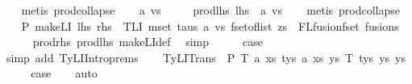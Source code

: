 \begin{isabellebody}
\ \ \isamarkupfalse%
\ {\isacharparenleft}{\kern0pt}metis\ prod{\isachardot}{\kern0pt}collapse{\isacharparenright}{\kern0pt}\isanewline
\ \ \isamarkupfalse%
\ a\ vs\ \isanewline
\ \ \ \ prod{\isacharunderscore}{\kern0pt}lhs{\isacharcolon}{\kern0pt}\ {\isachardoublequoteopen}lhs\ {\isacharequal}{\kern0pt}\ {\isacharparenleft}{\kern0pt}a{\isacharcomma}{\kern0pt}\ vs{\isacharparenright}{\kern0pt}{\isachardoublequoteclose}\isanewline
\ \ \isamarkupfalse%
\ {\isacharparenleft}{\kern0pt}metis\ prod{\isachardot}{\kern0pt}collapse{\isacharparenright}{\kern0pt}\isanewline
\ \ \isamarkupfalse%
\ P{}{\isacharcolon}{\kern0pt}\ {\isachardoublequoteopen}make{\isacharunderscore}{\kern0pt}LI\ {\isacharparenleft}{\kern0pt}lhs{\isacharcomma}{\kern0pt}\ rhs{\isacharparenright}{\kern0pt}\ {\isacharequal}{\kern0pt}\ TLI\ {\isacharparenleft}{\kern0pt}mset\ taus{\isacharparenright}{\kern0pt}\ a\ vs\ {\isacharparenleft}{\kern0pt}fset{\isacharunderscore}{\kern0pt}of{\isacharunderscore}{\kern0pt}list\ zs\ {\isacharbar}{\kern0pt}{\isasymunion}{\isacharbar}{\kern0pt}\ FLfusion{\isacharunderscore}{\kern0pt}fset\ fusions{\isacharparenright}{\kern0pt}{\isachardoublequoteclose}\isanewline
\ \ \ \ \isamarkupfalse%
\ prod{\isacharunderscore}{\kern0pt}rhs\ prod{\isacharunderscore}{\kern0pt}lhs\ make{\isacharunderscore}{\kern0pt}LI{\isacharunderscore}{\kern0pt}def\ \isamarkupfalse%
\ simp\isanewline
\ \ \isamarkupfalse%
\ \isamarkupfalse%
\ {\isacharquery}{\kern0pt}case\isanewline
\ \ \ \ \isamarkupfalse%
\ {\isacharparenleft}{\kern0pt}simp\ add{\isacharcolon}{\kern0pt}\ TyLIIntro{\isachardot}{\kern0pt}prems{\isacharparenleft}{\kern0pt}{}{\isacharparenright}{\kern0pt}{\isacharparenright}{\kern0pt}\isanewline
{}\isamarkupfalse%
\isanewline
\ \ \isamarkupfalse%
\ {\isacharparenleft}{\kern0pt}TyLITrans\ {\isasymGamma}\ P\ T{}\ a{}\ xs{}\ tys{}\ a{}\ xs{}\ ys{}\ T{}\ tys{}\ ys{}\ ys{\isacharparenright}{\kern0pt}\isanewline
\ \ \isamarkupfalse%
\ \isamarkupfalse%
\ {\isacharquery}{\kern0pt}case\isanewline
\ \ \isamarkupfalse%
\ auto\isanewline
\ \ \isamarkupfalse%
\isanewline
{}\isamarkupfalse%
\isanewline
\ \ \isamarkupfalse%

\end{isabellebody}
